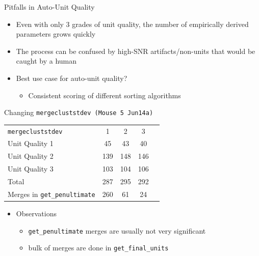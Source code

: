 \documentclass[11pt,handout]{beamer}
\begin{document}
    \begin{frame}{Pitfalls in Auto-Unit Quality}
        \begin{itemize}
            \pause
            \item Even with only 3 grades of unit quality, the number of
empirically derived parameters grows quickly
            \pause
            \item The process can be confused by high-SNR artifacts/non-units
that would be caught by a human
            \pause
            \item Best use case for auto-unit quality?
            \begin{itemize}
            \pause
                \item Consistent scoring of different sorting algorithms
            \end{itemize}
        \end{itemize}
    \end{frame}

    \begin{frame}{Changing \texttt{mergecluststdev (Mouse 5 Jun14a)}}
        \begin{center}
        \begin{tabular}{l c c c r}
        \pause
        \texttt{mergecluststdev}&1&2&3\\
        \pause
        Unit Quality 1&45&43&40\\
        \pause
        Unit Quality 2&139&148&146\\
        \pause
        Unit Quality 3&103&104&106\\
        \pause
        Total&287&295&292\\
        \pause
        Merges in \texttt{get\_penultimate}&260&61&24
        \end{tabular} 
        \end{center}
        \begin{itemize}
            \pause
            \item Observations
            \begin{itemize}
                \item \texttt{get\_penultimate} merges are usually not very
significant
                \item bulk of merges are done in \texttt{get\_final\_units}
            \end{itemize}
        \end{itemize}
    \end{frame}
\end{document}
